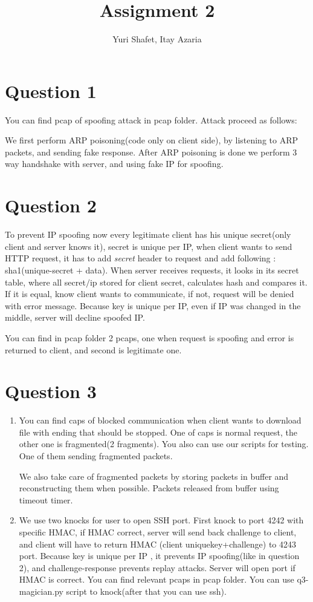 \documentclass{report}
\begin{document}
\author{Yuri Shafet, Itay Azaria}
\title{Assignment 2}
\maketitle

\section*{Question 1}
You can find pcap of spoofing attack in pcap folder.
Attack proceed as follows:

We first perform ARP poisoning(code only on client side), by listening to ARP packets, and sending fake response. After ARP poisoning is done we perform 3 way handshake with server, and using fake IP for spoofing.

\section*{Question 2}

To prevent IP spoofing now every legitimate client has his unique secret(only client and server knows it), secret is unique per IP, when client wants to send HTTP request, it has to add \emph{secret} header to request and add following : sha1(unique-secret + data). When server receives requests, it looks in its secret table, where all secret$/$ip stored for client secret,  calculates hash and compares it. If it is equal, know client wants to communicate, if not, request will be denied with error message. Because key is unique per IP, even if IP was changed in the middle, server will decline spoofed IP.

You can find in pcap folder 2 pcaps, one when request is spoofing and error is returned to client, and second is legitimate one.

\section*{Question 3}
\begin{enumerate}
\item 
	You can find caps of blocked communication when client wants to download file with ending that should be stopped. One of caps is normal request, the other one is fragmented(2 fragments). You also can use our scripts for testing. One of them sending fragmented packets.
	
	We also take care of fragmented packets by storing packets in buffer and reconstructing them when possible. Packets released from buffer using timeout timer.

\item
	We use two knocks for user to open SSH port. First knock to port 4242 with specific HMAC, if HMAC correct, server will send back challenge to client, and client will have to return HMAC (client uniquekey+challenge) to 4243 port. Because key is unique per IP , it prevents IP spoofing(like in question 2), and challenge-response prevents replay attacks. Server will open port if HMAC is correct. You can find relevant pcaps in pcap folder. You can use q3-magician.py script to knock(after that you can use ssh).
	


\end{enumerate}
\end{document}
